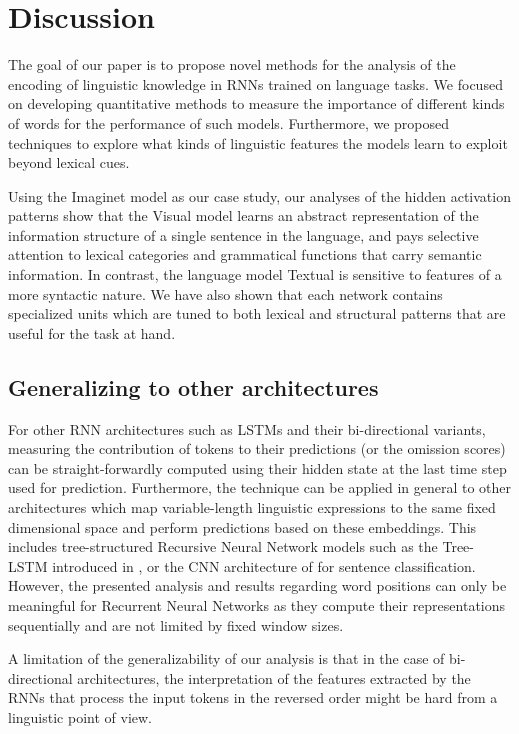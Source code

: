 \section{Discussion}
\label{sec:conclusion}

The goal of our paper is to propose novel methods for the 
analysis of the encoding of linguistic knowledge in RNNs trained on language tasks.
We focused on developing quantitative methods to measure the importance
of different kinds of words for the performance of such models. Furthermore, we
proposed techniques to explore what kinds of linguistic features the models
learn to exploit beyond lexical cues.

Using the {\sc Imaginet} model as our case study,
our analyses of the hidden activation patterns show that the {\sc Visual} model
learns an abstract representation of the information structure of a single
sentence in the language, and pays selective attention to lexical categories and
grammatical functions that carry semantic information. In contrast,
the language model {\sc Textual} is sensitive to features of a more
syntactic nature. We have also shown that each network contains
specialized units which are tuned to both lexical and structural
patterns that are useful for the task at hand.  


\subsection{Generalizing to other architectures}

For other RNN architectures such as LSTMs \label{edit:omitgeneral}
and their bi-directional variants, measuring the contribution
of tokens to their predictions (or the omission scores)
can be straight-forwardly computed using their hidden state 
at the last time step used for prediction. Furthermore, the technique 
can be applied in general to other architectures which
map variable-length linguistic expressions to the same fixed dimensional
space and perform predictions based on these embeddings. 
This includes tree-structured Recursive Neural Network models such as the Tree-LSTM
introduced in , or the CNN architecture of  
for sentence classification. 
However,
the presented analysis and results regarding word positions can only be meaningful
for Recurrent Neural Networks as they compute their representations sequentially and are not
limited by fixed window sizes.

A limitation of the generalizability of our 
analysis is that in the case of 
bi-directional architectures, the interpretation of the features
extracted by the RNNs that process the input tokens in the reversed order
might be hard from a linguistic point of view. 

